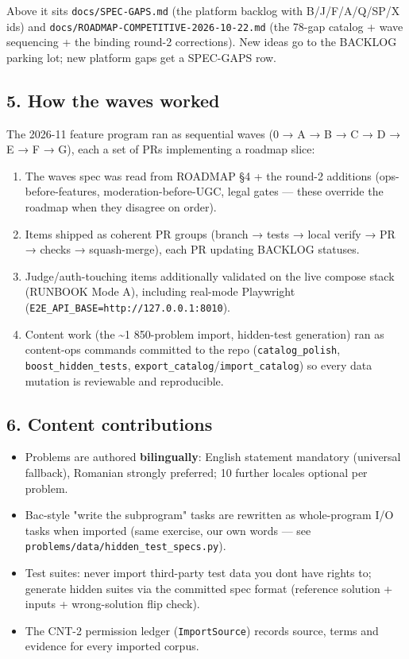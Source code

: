 \documentclass[
]{article}
\providecommand{\tightlist}{%
  \setlength{\itemsep}{0pt}\setlength{\parskip}{0pt}}
\begin{document}
Above it sits \texttt{docs/SPEC-GAPS.md} (the platform backlog with
B/J/F/A/Q/SP/X ids) and \texttt{docs/ROADMAP-COMPETITIVE-2026-10-22.md}
(the 78-gap catalog + wave sequencing + the binding round-2
corrections). New ideas go to the BACKLOG parking lot; new platform gaps
get a SPEC-GAPS row.

\subsection{5. How the waves worked}\label{5-how-the-waves-worked}

The 2026-11 feature program ran as sequential waves (0 → A → B → C → D →
E → F → G), each a set of PRs implementing a roadmap slice:

\begin{enumerate}
\def\labelenumi{\arabic{enumi}.}
\tightlist
\item
  The wave\textquotesingle s spec was read from ROADMAP §4 + the round-2
  additions (ops-before-features, moderation-before-UGC, legal gates ---
  these override the roadmap when they disagree on order).
\item
  Items shipped as coherent PR groups (branch → tests → local verify →
  PR → checks → squash-merge), each PR updating BACKLOG statuses.
\item
  Judge/auth-touching items additionally validated on the live compose
  stack (RUNBOOK Mode A), including real-mode Playwright
  (\texttt{E2E\_API\_BASE=http://127.0.0.1:8010}).
\item
  Content work (the \textasciitilde1 850-problem import, hidden-test
  generation) ran as content-ops commands committed to the repo
  (\texttt{catalog\_polish}, \texttt{boost\_hidden\_tests},
  \texttt{export\_catalog}/\texttt{import\_catalog}) so every data
  mutation is reviewable and reproducible.
\end{enumerate}

\subsection{6. Content contributions}\label{6-content-contributions}

\begin{itemize}
\tightlist
\item
  Problems are authored \textbf{bilingually}: English statement
  mandatory (universal fallback), Romanian strongly preferred; 10
  further locales optional per problem.
\item
  Bac-style "write the subprogram" tasks are rewritten as whole-program
  I/O tasks when imported (same exercise, our own words --- see
  \texttt{problems/data/hidden\_test\_specs.py}).
\item
  Test suites: never import third-party test data you
  don\textquotesingle t have rights to; generate hidden suites via the
  committed spec format (reference solution + inputs + wrong-solution
  flip check).
\item
  The CNT-2 permission ledger (\texttt{ImportSource}) records source,
  terms and evidence for every imported corpus.
\end{itemize}
\end{document}
